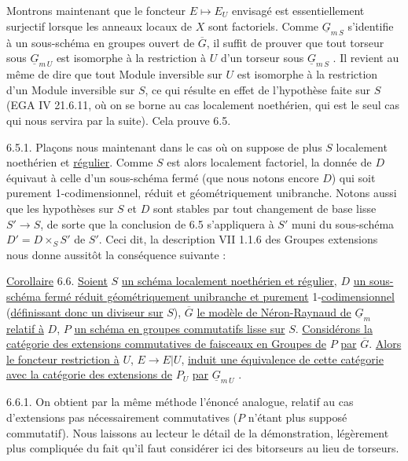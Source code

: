 Montrons maintenant que le foncteur $E \longmapsto E_U$ envisagé est essentiellement surjectif lorsque les anneaux locaux de $X$ sont factoriels. Comme $\underline{G}_{m\,S}$ s'identifie à un sous-schéma en groupes ouvert de $\overline{G}$, il suffit de prouver que tout torseur sous $\underline{G}_{m\,U}$ est isomorphe à la restriction à $U$ d'un torseur sous $\underline{G}_{m\,S}$ . Il revient au même de dire que tout Module inversible sur $U$ est isomorphe à la restriction d'un Module inversible sur $S$, ce qui résulte en effet de l'hypothèse faite sur $S$ (EGA IV 21.6.11, où on se borne au cas localement noethérien, qui est le seul cas qui nous servira par la suite). Cela prouve 6.5.


6.5.1. Plaçons nous maintenant dans le cas où on suppose de plus $S$ localement noethérien et \underline{régulier}. Comme $S$ est alors localement factoriel, la donnée de $D$ équivaut à celle d'un sous-schéma fermé (que nous notons encore $D$) qui soit purement 1-codimensionnel, réduit et géométriquement unibranche. Notons aussi que les hypothèses sur $S$ et $D$ sont stables par tout changement de base lisse $S' \longrightarrow S$, de sorte que la conclusion de 6.5 s'appliquera à $S'$ muni du sous-schéma $D' = D \times_S S'$ de $S'$. Ceci dit, la description VII 1.1.6 des Groupes extensions nous donne aussitôt la conséquence suivante :

\underline{Corollaire} 6.6. \underline{Soient} $S$ \underline{un schéma localement noethérien et régulier}, $D$ \underline{un sous-schéma fermé réduit géométriquement unibranche et purement} 1-\underline{codimensionnel} (\underline{définissant donc un diviseur sur} $S$), $\overline{G}$ \underline{le modèle de Néron-Raynaud de} $\underline{G}_m$ \underline{relatif à} $D$, $P$ \underline{un schéma en groupes commutatifs lisse sur} $S$. \underline{Considérons la catégorie des extensions commutatives de faisceaux en Groupes de} $P$ \underline{par} $\overline{G}$. \underline{Alors le foncteur restriction à} $U$, $E \longrightarrow E|U$, \underline{induit une équivalence de cette catégorie avec la catégorie des extensions de} $P_U$ \underline{par} $\underline{G}_{m\,U}$ .

6.6.1. On obtient par la même méthode l'énoncé analogue, relatif au cas d'extensions pas nécessairement commutatives ($P$ n'étant plus supposé commutatif). Nous laissons au lecteur le détail de la démonstration, légèrement plus compliquée du fait qu'il faut considérer ici des bitorseurs au lieu de torseurs.

